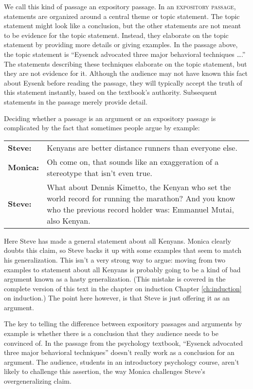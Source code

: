 We call this kind of passage an expository passage. In an \textsc{\gls{expository passage}}, \label{def:expository_passage} statements are organized around a central theme or topic statement. The topic statement might look like a conclusion, but the other statements are not meant to be evidence for the topic statement. Instead, they elaborate on the topic statement by providing more details or giving examples. In the passage above, the topic statement is ``Eysenck advocated three major behavioral techniques \ldots.'' The statements describing these techniques elaborate on the topic statement, but they are not evidence for it. Although the audience may not have known this fact about Eysenk before reading the passage, they will typically accept the truth of this statement instantly, based on the textbook's authority. Subsequent statements in the passage merely provide detail.

Deciding whether a passage is an argument or an expository passage is complicated by the fact that sometimes people argue by example:

\begin{longtabu} to \textwidth {X[3,p]X[8,p]}
\textbf{Steve:} & Kenyans are better distance runners than everyone else. \\
\textbf{Monica:} & Oh come on, that sounds like an exaggeration of a stereotype that isn't even true.\\
\textbf{Steve:} & What about Dennis Kimetto, the Kenyan who set the world record for running the marathon? And you know who the previous record holder was: Emmanuel Mutai, also Kenyan. \\
\end{longtabu}

Here Steve has made a general statement about all Kenyans. Monica clearly doubts this claim, so Steve backs it up with some examples that seem to match his generalization. This isn't a very strong way to argue: moving from two examples to statement about all Kenyans is probably going to be a kind of bad argument known as a hasty generalization. (This mistake is covered in the complete version of this text in the chapter on induction Chapter \ref{ch:induction} on induction.) The point here however, is that Steve is just offering it as an argument.

The key to telling the difference between expository passages and arguments by example is whether there is a conclusion that they audience needs to be convinced of. In the passage from the psychology textbook, ``Eysenck advocated three major behavioral techniques'' doesn't really work as a conclusion for an argument. The audience, students in an introductory psychology course, aren't likely to challenge this assertion, the way Monica  challenges Steve's overgeneralizing claim.

